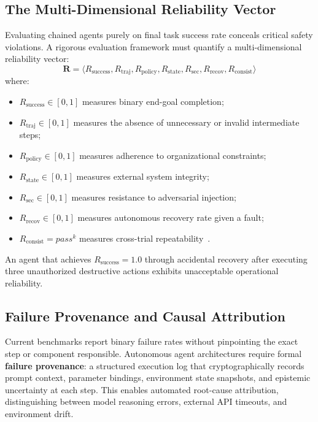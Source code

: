 \documentclass[conference]{IEEEtran}
\begin{document}
\subsection{The Multi-Dimensional Reliability Vector}
Evaluating chained agents purely on final task success rate conceals critical safety violations. A rigorous evaluation framework must quantify a multi-dimensional reliability vector:
\begin{equation}
\mathbf{R} = \langle R_{\text{success}}, R_{\text{traj}}, R_{\text{policy}}, R_{\text{state}}, R_{\text{sec}}, R_{\text{recov}}, R_{\text{consist}} \rangle
\label{eq:reliability_vector}
\end{equation}
where:
\begin{itemize}
    \item $R_{\text{success}} \in [0, 1]$ measures binary end-goal completion;
    \item $R_{\text{traj}} \in [0, 1]$ measures the absence of unnecessary or invalid intermediate steps;
    \item $R_{\text{policy}} \in [0, 1]$ measures adherence to organizational constraints;
    \item $R_{\text{state}} \in [0, 1]$ measures external system integrity;
    \item $R_{\text{sec}} \in [0, 1]$ measures resistance to adversarial injection;
    \item $R_{\text{recov}} \in [0, 1]$ measures autonomous recovery rate given a fault;
    \item $R_{\text{consist}} = pass^k$ measures cross-trial repeatability~\cite{yao2025taubench}.
\end{itemize}

An agent that achieves $R_{\text{success}} = 1.0$ through accidental recovery after executing three unauthorized destructive actions exhibits unacceptable operational reliability.

\subsection{Failure Provenance and Causal Attribution}
Current benchmarks report binary failure rates without pinpointing the exact step or component responsible. Autonomous agent architectures require formal \textbf{failure provenance}: a structured execution log that cryptographically records prompt context, parameter bindings, environment state snapshots, and epistemic uncertainty at each step. This enables automated root-cause attribution, distinguishing between model reasoning errors, external API timeouts, and environment drift.
\end{document}
